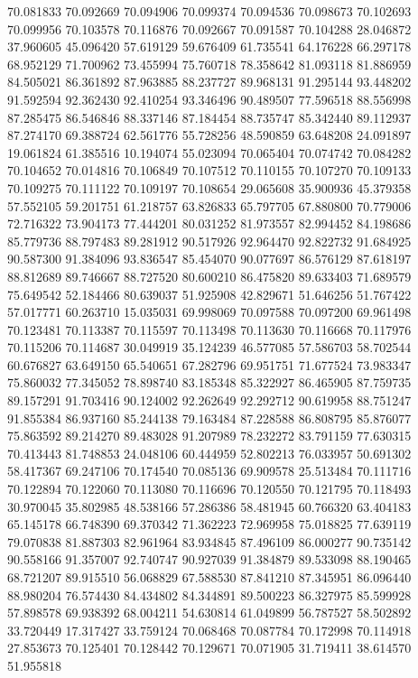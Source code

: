 70.081833
70.092669
70.094906
70.099374
70.094536
70.098673
70.102693
70.099956
70.103578
70.116876
70.092667
70.091587
70.104288
28.046872
37.960605
45.096420
57.619129
59.676409
61.735541
64.176228
66.297178
68.952129
71.700962
73.455994
75.760718
78.358642
81.093118
81.886959
84.505021
86.361892
87.963885
88.237727
89.968131
91.295144
93.448202
91.592594
92.362430
92.410254
93.346496
90.489507
77.596518
88.556998
87.285475
86.546846
88.337146
87.184454
88.735747
85.342440
89.112937
87.274170
69.388724
62.561776
55.728256
48.590859
63.648208
24.091897
19.061824
61.385516
10.194074
55.023094
70.065404
70.074742
70.084282
70.104652
70.014816
70.106849
70.107512
70.110155
70.107270
70.109133
70.109275
70.111122
70.109197
70.108654
29.065608
35.900936
45.379358
57.552105
59.201751
61.218757
63.826833
65.797705
67.880800
70.779006
72.716322
73.904173
77.444201
80.031252
81.973557
82.994452
84.198686
85.779736
88.797483
89.281912
90.517926
92.964470
92.822732
91.684925
90.587300
91.384096
93.836547
85.454070
90.077697
86.576129
87.618197
88.812689
89.746667
88.727520
80.600210
86.475820
89.633403
71.689579
75.649542
52.184466
80.639037
51.925908
42.829671
51.646256
51.767422
57.017771
60.263710
15.035031
69.998069
70.097588
70.097200
69.961498
70.123481
70.113387
70.115597
70.113498
70.113630
70.116668
70.117976
70.115206
70.114687
30.049919
35.124239
46.577085
57.586703
58.702544
60.676827
63.649150
65.540651
67.282796
69.951751
71.677524
73.983347
75.860032
77.345052
78.898740
83.185348
85.322927
86.465905
87.759735
89.157291
91.703416
90.124002
92.262649
92.292712
90.619958
88.751247
91.855384
86.937160
85.244138
79.163484
87.228588
86.808795
85.876077
75.863592
89.214270
89.483028
91.207989
78.232272
83.791159
77.630315
70.413443
81.748853
24.048106
60.444959
52.802213
76.033957
50.691302
58.417367
69.247106
70.174540
70.085136
69.909578
25.513484
70.111716
70.122894
70.122060
70.113080
70.116696
70.120550
70.121795
70.118493
30.970045
35.802985
48.538166
57.286386
58.481945
60.766320
63.404183
65.145178
66.748390
69.370342
71.362223
72.969958
75.018825
77.639119
79.070838
81.887303
82.961964
83.934845
87.496109
86.000277
90.735142
90.558166
91.357007
92.740747
90.927039
91.384879
89.533098
88.190465
68.721207
89.915510
56.068829
67.588530
87.841210
87.345951
86.096440
88.980204
76.574430
84.434802
84.344891
89.500223
86.327975
85.599928
57.898578
69.938392
68.004211
54.630814
61.049899
56.787527
58.502892
33.720449
17.317427
33.759124
70.068468
70.087784
70.172998
70.114918
27.853673
70.125401
70.128442
70.129671
70.071905
31.719411
38.614570
51.955818
